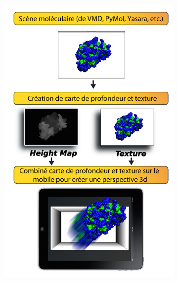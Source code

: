 \begin{figure}
\begin{subfigure}{.5\textwidth}
  \centering
  {\includegraphics[width=.75\linewidth]{./figures/ch3/depthmol3d_process_edit}}
    \caption{}
  \label{Fig:pymol_stereo}
\end{subfigure}
\begin{subfigure}{.5\textwidth}
  \centering

\end{subfigure}
\end{figure}
